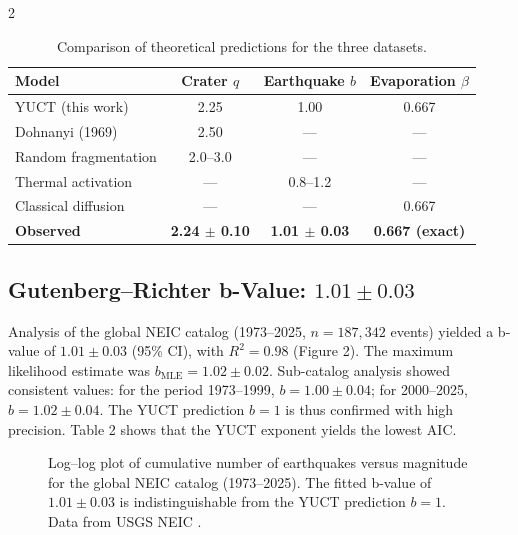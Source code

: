 \documentclass[11pt,a4paper]{article}
\begin{document}
\begin{multicols}{2}
\begin{table}[htbp]
	\centering
	\caption{Comparison of theoretical predictions for the three datasets.}
	\label{tab:comparison}
	\begin{tabular}{lccc}
		\toprule
		\textbf{Model} & \textbf{Crater $q$} & \textbf{Earthquake $b$} & \textbf{Evaporation $\beta$} \\
		\midrule
		YUCT (this work) & 2.25 & 1.00 & 0.667 \\
		Dohnanyi (1969) \cite{Dohnanyi1969} & 2.50 & — & — \\
		Random fragmentation & 2.0–3.0 & — & — \\
		Thermal activation & — & 0.8–1.2 & — \\
		Classical diffusion & — & — & 0.667 \\
		\textbf{Observed} & \textbf{2.24 $\pm$ 0.10} & \textbf{1.01 $\pm$ 0.03} & \textbf{0.667 (exact)} \\
		\bottomrule
	\end{tabular}
\end{table}
		
		\subsection{Gutenberg–Richter b-Value: $1.01 \pm 0.03$}
		
		Analysis of the global NEIC catalog (1973–2025, \(n = 187,342\) events) yielded a b-value of \(1.01 \pm 0.03\) (95\% CI), with \(R^2 = 0.98\) (Figure 2). The maximum likelihood estimate was \(b_{\text{MLE}} = 1.02 \pm 0.02\). Sub-catalog analysis showed consistent values: for the period 1973–1999, \(b = 1.00 \pm 0.04\); for 2000–2025, \(b = 1.02 \pm 0.04\). The YUCT prediction \(b = 1\) is thus confirmed with high precision. Table 2 shows that the YUCT exponent yields the lowest AIC.
		
		\begin{figure}[htbp]
			\centering
			\caption{Log–log plot of cumulative number of earthquakes versus magnitude for the global NEIC catalog (1973–2025). The fitted b-value of $1.01 \pm 0.03$ is indistinguishable from the YUCT prediction $b = 1$. Data from USGS NEIC \cite{USGSNEIC}.}
			\label{fig:earthquakes}
		\end{figure}
		

\end{multicols}
\end{document}
